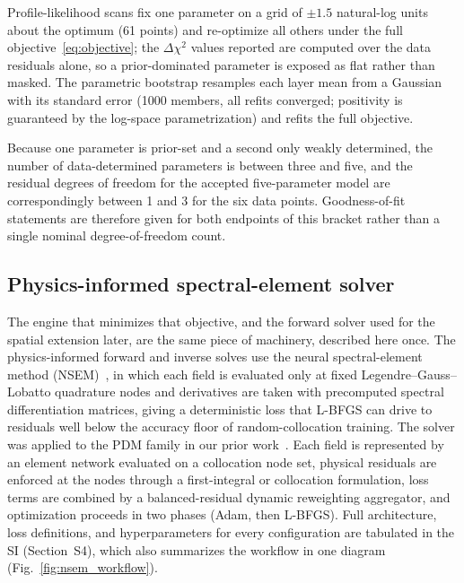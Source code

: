 \documentclass[a4paper,fleqn]{cas-sc}
\begin{document}
Profile-likelihood scans fix one parameter on a grid of $\pm1.5$
natural-log units about the optimum (61 points) and re-optimize all
others under the full objective~\eqref{eq:objective}; the
$\Delta\chi^2$ values reported are computed over the data residuals
alone, so a prior-dominated parameter is exposed as flat rather than
masked. The parametric bootstrap resamples each layer mean from a
Gaussian with its standard error (1000 members, all refits converged;
positivity is guaranteed by the log-space parametrization) and refits
the full objective.

Because one parameter is prior-set and a second only weakly determined,
the number of data-determined parameters is between three and five, and the residual
degrees of freedom for the accepted five-parameter model are
correspondingly between 1 and 3 for the six data points. Goodness-of-fit
statements are therefore given for both endpoints of this
bracket rather than a single nominal degree-of-freedom count.

\subsection{Physics-informed spectral-element solver}\label{sec:nsem}

The engine that minimizes that objective, and the forward solver used
for the spatial extension later, are the same piece of machinery,
described here once. The physics-informed forward and inverse solves use
the neural
spectral-element method (NSEM)~\citep{feugmo2026nsem}, in which each
field is evaluated only at fixed Legendre--Gauss--Lobatto quadrature
nodes and derivatives are taken with precomputed spectral
differentiation matrices, giving a deterministic loss that L-BFGS can
drive to residuals well below the accuracy floor of random-collocation
training. The solver was applied to the PDM family in our prior
work~\citep{farooqi2025pinnpdm}. Each field is represented by an
element network evaluated on a collocation node set, physical residuals
are enforced at the nodes through a first-integral or collocation
formulation, loss terms are combined by a balanced-residual dynamic
reweighting aggregator, and optimization proceeds in two phases (Adam,
then L-BFGS). Full architecture, loss definitions, and hyperparameters
for every configuration are tabulated in the SI (Section~S4), which also
summarizes the workflow in one diagram (Fig.~\ref{fig:nsem_workflow}).
\end{document}
